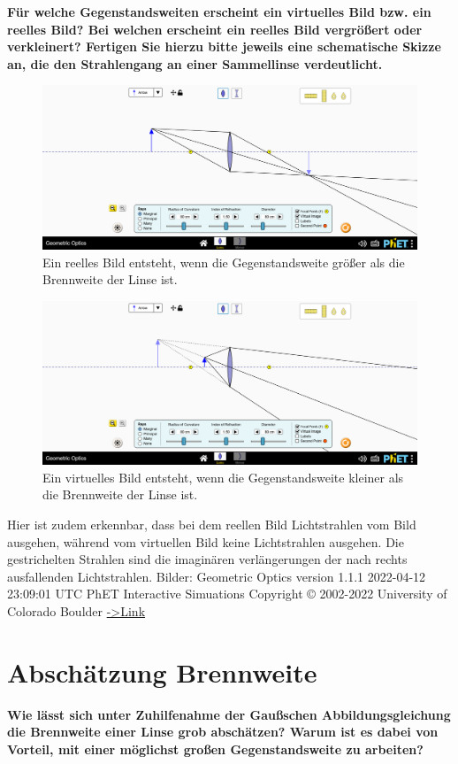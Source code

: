 \documentclass[a4paper, 12pt]{article}
\begin{document}
\textbf{Für welche Gegenstandsweiten erscheint ein virtuelles Bild bzw. ein reelles Bild? Bei welchen erscheint ein reelles Bild vergrößert oder verkleinert? 
Fertigen Sie hierzu bitte jeweils eine schematische Skizze an, die den Strahlengang an einer Sammellinse verdeutlicht.}
\begin{figure}[h]
\centering
	\includegraphics[scale=0.28]{A.png}
	\caption{Ein reelles Bild entsteht, wenn die Gegenstandsweite größer als die Brennweite der Linse ist.}
\end{figure}
\begin{figure}[h]
\centering
	\includegraphics[scale=0.28]{B.png}
	\caption{Ein virtuelles Bild entsteht, wenn die Gegenstandsweite kleiner als die Brennweite der Linse ist.}
\end{figure}

Hier ist zudem erkennbar, dass bei dem reellen Bild Lichtstrahlen vom Bild ausgehen, während vom virtuellen Bild keine Lichtstrahlen ausgehen. Die gestrichelten Strahlen sind die imaginären verlängerungen der nach rechts ausfallenden Lichtstrahlen.
\tiny
Bilder: Geometric Optics version 1.1.1 2022-04-12 23:09:01 UTC PhET Interactive Simuations Copyright © 2002-2022 University of Colorado Boulder \href{https://phet.colorado.edu/sims/html/geometric-optics/latest/geometric-optics_en.html}{->Link}
\normalsize

\section{Abschätzung Brennweite}
\textbf{Wie lässt sich unter Zuhilfenahme der Gaußschen Abbildungsgleichung die Brennweite einer Linse grob abschätzen? Warum ist es dabei von Vorteil, mit einer möglichst großen Gegenstandsweite zu arbeiten?}
\end{document}

